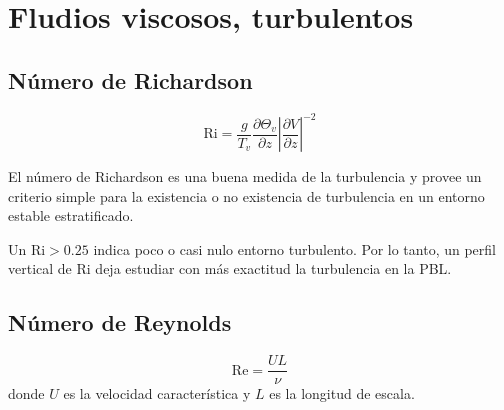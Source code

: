 \documentclass[utf-8,11pt,a4paper]{article}
\begin{document}
\section{Fludios viscosos, turbulentos}
\subsection{Número de Richardson}
\begin{equation}
    \mathrm{Ri}=\frac{g}{T_{v}}\frac{\partial \Theta_{v}}{\partial z}\left|\frac{\partial V}{\partial z}\right|^{-2}
\end{equation}
\par El número de Richardson es una buena medida de la turbulencia y provee un criterio simple para la existencia o no existencia de turbulencia en un entorno estable estratificado.
\par Un $\mathrm{Ri}>0.25$ indica poco o casi nulo entorno turbulento. Por lo tanto, un perfil vertical de $\mathrm{Ri}$ deja estudiar con más exactitud la turbulencia en la PBL.
\subsection{Número de Reynolds}
\begin{equation}
    \mathrm{Re}=\frac{UL}{\nu}
\end{equation}
donde $U$ es la velocidad característica y $L$ es la longitud de escala.
\end{document}
